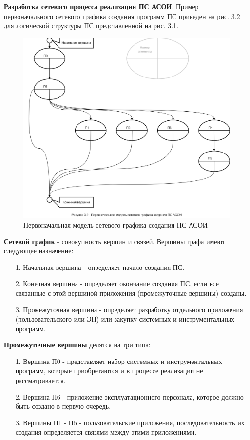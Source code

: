\documentclass[12pt, a4paper, simple]{eskdtext}
\begin{document}
    \newpage
    \textbf{Разработка сетевого процесса реализации ПС АСОИ}.
    Пример первоначального сетевого графика создания программ ПС приведен на рис. 3.2 для логической структуры ПС представленной на рис. 3.1. 

    \begin{figure}[h!]
        \centering
        \includegraphics[width=16cm]
            {_docs/Рисунок3-2ПервоначальнаяМодельСетевогоГрафикаСозданияПСАСОИ.png}
        \caption{Первоначальная модель сетевого графика создания ПС АСОИ}
    \end{figure}

    \textbf{Сетевой график} - совокупность вершин и связей. Вершины графа имеют следующее назначение:
    \begin{enumerate}
        \item[1.] Начальная вершина - определяет начало создания ПС.
        \item[2.] Конечная вершина - определяет окончание создания ПС,
        если все связанные с этой вершиной приложения (промежуточные вершины) созданы.
        \item[3.] Промежуточная вершина - определяет разработку отдельного приложения (пользовательского или ЭП)
        или закупку системных и инструментальных программ.
    \end{enumerate}
   
    \textbf{Промежуточные вершины} делятся на три типа:
    \begin{enumerate}
        \item[1.] Вершина П0 - представляет набор системных и инструментальных программ,
        которые приобретаются и в процессе реализации не рассматривается.
        \item[2.] Вершина П6 - приложение эксплуатационного персонала,
        которое должно быть создано в первую очередь.
        \item[3.] Вершины П1 - П5 - пользовательские приложения,
        последовательность их создания определяется связями между этими приложениями.
    \end{enumerate}
\end{document}
